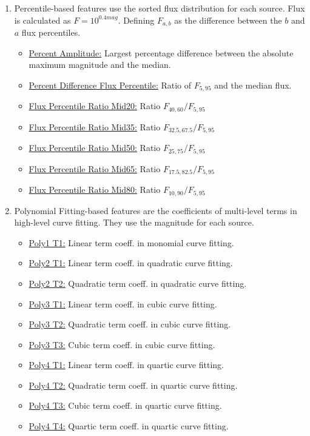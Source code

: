 \begin{enumerate}
    \item Percentile-based features use the sorted flux distribution for each source. Flux is calculated as $F = 10^{0.4mag}$. Defining $F_{a,b}$ as the difference between the $b$ and $a$ flux percentiles.
    \begin{itemize}
        \item \underline{Percent Amplitude:} Largest percentage difference between the absolute maximum magnitude and the median.
        \item \underline{Percent Difference Flux Percentile:} Ratio of $F_{5,95}$ and the median flux.
        \item \underline{Flux Percentile Ratio Mid20:} Ratio $F_{40,60} / F_{5,95}$
        \item \underline{Flux Percentile Ratio Mid35:} Ratio $F_{32.5,67.5} / F_{5,95}$
        \item \underline{Flux Percentile Ratio Mid50:} Ratio $F_{25,75} / F_{5,95}$
        \item \underline{Flux Percentile Ratio Mid65:} Ratio $F_{17.5,82.5} / F_{5,95}$
        \item \underline{Flux Percentile Ratio Mid80:} Ratio $F_{10,90} / F_{5,95}$
    \end{itemize}
    
    \item Polynomial Fitting-based features are the coefficients of multi-level terms in high-level curve fitting. They use the magnitude for each source.
    \begin{itemize}
        \item \underline{Poly1 T1:} Linear term coeff. in monomial curve fitting.
        \item \underline{Poly2 T1:} Linear term coeff. in quadratic curve fitting.
        \item \underline{Poly2 T2:} Quadratic term coeff. in quadratic curve fitting.
        \item \underline{Poly3 T1:} Linear term coeff. in cubic curve fitting.
        \item \underline{Poly3 T2:} Quadratic term coeff. in cubic curve fitting.
        \item \underline{Poly3 T3:} Cubic term coeff. in cubic curve fitting.
        \item \underline{Poly4 T1:} Linear term coeff. in quartic curve fitting.
        \item \underline{Poly4 T2:} Quadratic term coeff. in quartic curve fitting.
        \item \underline{Poly4 T3:} Cubic term coeff. in quartic curve fitting.
        \item \underline{Poly4 T4:} Quartic term coeff. in quartic curve fitting.
    \end{itemize}

\end{enumerate}


